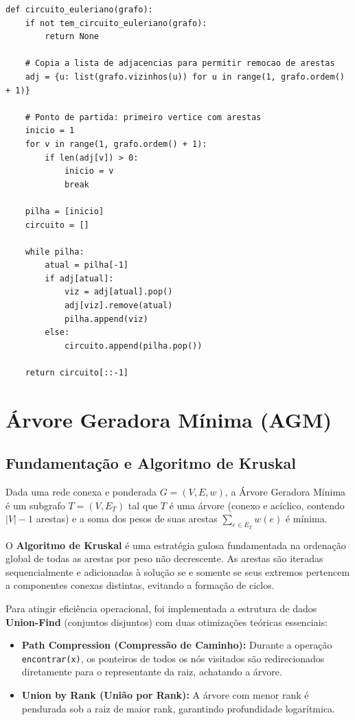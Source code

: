 \documentclass[12pt,a4paper]{article}
\begin{document}
\begin{lstlisting}[caption={Algoritmo de Hierholzer em \texttt{euler.py}}, label={cod:euler}]
def circuito_euleriano(grafo):
    if not tem_circuito_euleriano(grafo):
        return None

    # Copia a lista de adjacencias para permitir remocao de arestas
    adj = {u: list(grafo.vizinhos(u)) for u in range(1, grafo.ordem() + 1)}
    
    # Ponto de partida: primeiro vertice com arestas
    inicio = 1
    for v in range(1, grafo.ordem() + 1):
        if len(adj[v]) > 0:
            inicio = v
            break

    pilha = [inicio]
    circuito = []

    while pilha:
        atual = pilha[-1]
        if adj[atual]:
            viz = adj[atual].pop()
            adj[viz].remove(atual)
            pilha.append(viz)
        else:
            circuito.append(pilha.pop())

    return circuito[::-1]
\end{lstlisting}

\section{Árvore Geradora Mínima (AGM)}

\subsection{Fundamentação e Algoritmo de Kruskal}
Dada uma rede conexa e ponderada $G = (V, E, w)$, a Árvore Geradora Mínima é um subgrafo $T = (V, E_T)$ tal que $T$ é uma árvore (conexo e acíclico, contendo $|V|-1$ arestas) e a soma dos pesos de suas arestas $\sum_{e \in E_T} w(e)$ é mínima.

O \textbf{Algoritmo de Kruskal} é uma estratégia gulosa fundamentada na ordenação global de todas as arestas por peso não decrescente. As arestas são iteradas sequencialmente e adicionadas à solução se e somente se seus extremos pertencem a componentes conexas distintas, evitando a formação de ciclos.

Para atingir eficiência operacional, foi implementada a estrutura de dados \textbf{Union-Find} (conjuntos disjuntos) com duas otimizações teóricas essenciais:
\begin{itemize}
    \item \textbf{Path Compression (Compressão de Caminho):} Durante a operação \texttt{encontrar(x)}, os ponteiros de todos os nós visitados são redirecionados diretamente para o representante da raiz, achatando a árvore.
    \item \textbf{Union by Rank (União por Rank):} A árvore com menor rank é pendurada sob a raiz de maior rank, garantindo profundidade logarítmica.
\end{itemize}
\end{document}
